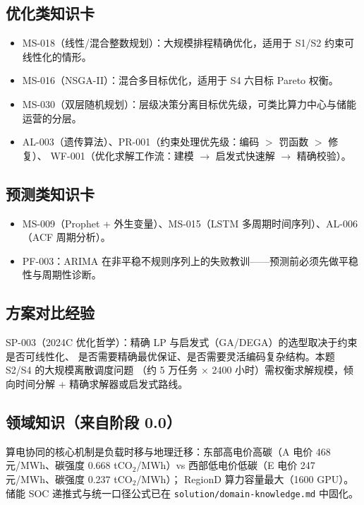 \documentclass{internal-report}
\begin{document}
\subsection{优化类知识卡}

\begin{itemize}
  \item MS-018（线性/混合整数规划）：大规模排程精确优化，适用于 S1/S2 约束可线性化的情形。
  \item MS-016（NSGA-II）：混合多目标优化，适用于 S4 六目标 Pareto 权衡。
  \item MS-030（双层随机规划）：层级决策分离目标优先级，可类比算力中心与储能运营的分层。
  \item AL-003（遗传算法）、PR-001（约束处理优先级：编码 $>$ 罚函数 $>$ 修复）、
        WF-001（优化求解工作流：建模 $\rightarrow$ 启发式快速解 $\rightarrow$ 精确校验）。
\end{itemize}

\subsection{预测类知识卡}

\begin{itemize}
  \item MS-009（Prophet + 外生变量）、MS-015（LSTM 多周期时间序列）、AL-006（ACF 周期分析）。
  \item PF-003：ARIMA 在非平稳不规则序列上的失败教训——预测前必须先做平稳性与周期性诊断。
\end{itemize}

\subsection{方案对比经验}

SP-003（2024C 优化哲学）：精确 LP 与启发式（GA/DEGA）的选型取决于约束是否可线性化、
是否需要精确最优保证、是否需要灵活编码复杂结构。本题 S2/S4 的大规模离散调度问题
（约 5 万任务 × 2400 小时）需权衡求解规模，倾向时间分解 + 精确求解器或启发式路线。

\subsection{领域知识（来自阶段 0.0）}

算电协同的核心机制是负载时移与地理迁移：东部高电价高碳（A 电价 468 元/MWh、碳强度
0.668 tCO$_2$/MWh）vs 西部低电价低碳（E 电价 247 元/MWh、碳强度 0.237 tCO$_2$/MWh）；
RegionD 算力容量最大（1600 GPU）。储能 SOC 递推式与统一口径公式已在
\texttt{solution/domain-knowledge.md} 中固化。
\end{document}
